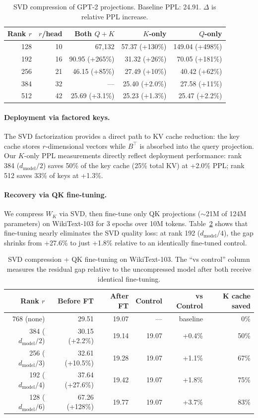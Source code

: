 \documentclass{article} %
\newcommand{\dmodel}{d_{\text{model}}}
\begin{document}
\begin{table}[h]
\centering
\caption{SVD compression of GPT-2 projections. Baseline PPL: 24.91. $\Delta$ is relative PPL increase.}
\label{tab:svd}
\begin{tabular}{rrrrr}
\toprule
Rank $r$ & $r$/head & Both $Q{+}K$ & $K$-only & $Q$-only \\
\midrule
128 & 10 & 67,132 & 57.37 (+130\%) & 149.04 (+498\%) \\
192 & 16 & 90.95 (+265\%) & 31.32 (+26\%) & 70.05 (+181\%) \\
256 & 21 & 46.15 (+85\%) & 27.49 (+10\%) & 40.42 (+62\%) \\
384 & 32 & --- & 25.40 (+2.0\%) & 27.58 (+11\%) \\
512 & 42 & 25.69 (+3.1\%) & 25.23 (+1.3\%) & 25.47 (+2.2\%) \\
\bottomrule
\end{tabular}
\end{table}

\paragraph{Deployment via factored keys.}
The SVD factorization provides a direct path to KV cache reduction: the key cache stores $r$-dimensional vectors while $B^\top$ is absorbed into the query projection. Our $K$-only PPL measurements directly reflect deployment performance: rank 384 ($\dmodel/2$) saves 50\% of the key cache (25\% total KV) at +2.0\% PPL; rank 512 saves 33\% of keys at +1.3\%.

\paragraph{Recovery via QK fine-tuning.}
We compress $W_K$ via SVD, then fine-tune only QK projections ($\sim$21M of 124M parameters) on WikiText-103 for 3 epochs over 10M tokens. Table~\ref{tab:svd_finetune} shows that fine-tuning nearly eliminates the SVD quality loss: at rank 192 ($\dmodel/4$), the gap shrinks from +27.6\% to just +1.8\% relative to an identically fine-tuned control.

\begin{table}[h]
\centering
\caption{SVD compression + QK fine-tuning on WikiText-103. The ``vs control'' column measures the residual gap relative to the uncompressed model after both receive identical fine-tuning.}
\label{tab:svd_finetune}
\begin{tabular}{rrrrrr}
\toprule
Rank $r$ & Before FT & After FT & Control & vs Control & K cache saved \\
\midrule
768 (none) & 29.51 & 19.07 & --- & baseline & 0\% \\
384 ($\dmodel/2$) & 30.15 (+2.2\%) & 19.14 & 19.07 & +0.4\% & 50\% \\
256 ($\dmodel/3$) & 32.61 (+10.5\%) & 19.28 & 19.07 & +1.1\% & 67\% \\
192 ($\dmodel/4$) & 37.64 (+27.6\%) & 19.42 & 19.07 & +1.8\% & 75\% \\
128 ($\dmodel/6$) & 67.26 (+128\%) & 19.77 & 19.07 & +3.7\% & 83\% \\
\bottomrule
\end{tabular}
\end{table}
\end{document}
